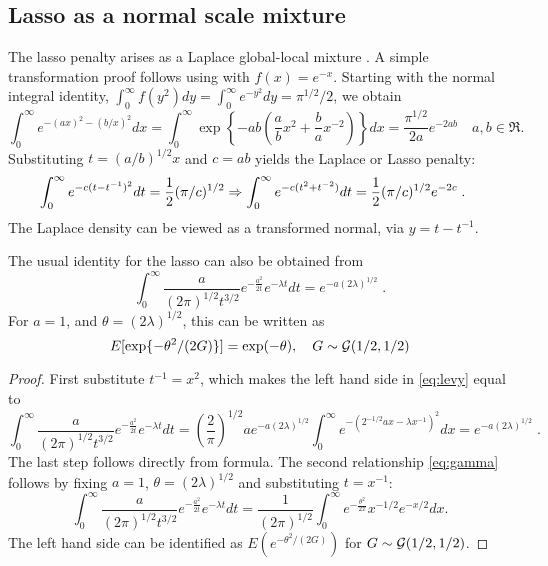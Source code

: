 \documentclass[lineno]{biometrika}
\begin{document}
\subsection{Lasso as a normal scale mixture}
The lasso penalty arises as a Laplace global-local mixture
\citep{andrews_scale_1974}.  A simple transformation proof follows using \CS{}
with $f(x) = e^{-x}$.  Starting with the normal integral identity, 
$\int_{0}^{\infty} f(y^2) dy = \int_0^\infty e^{-y^2} dy = \pi^{1/2}/2 $, we
obtain
\[
\int_0^\infty e^{-(a x)^2 - (b/x)^2} d x = \int_0^{\infty} 
\exp\left\{-a b \left(\frac{a}{b} x^2 + \frac{b}{a} x^{-2} \right)\right\} dx 
= \frac{\pi^{1/2}}{2a} e^{-2 a b}
\quad a,b \in \Re.
\]
Substituting $t = (a/b)^{1/2} x$ and $c = ab$ yields the Laplace or Lasso penalty:  
\begin{align*}
  \int_0^\infty e^{- c (t - t^{-1})^2} dt 
  &= \frac{1}{2} (\pi/c)^{1/2} 
  \Rightarrow \int_0^\infty e^{- c (t^2 + t^{-2})} dt 
  = \frac{1}{2} (\pi/c)^{1/2} e^{-2c}
  \;. 
\end{align*}
The Laplace density can be viewed as a transformed normal, via $y = t - t^{-1}$.

\begin{remark}
The usual identity for the lasso can also be obtained from \citet{levy1940certains}
\begin{equation}
  \int_{0}^{\infty} \frac{a}{(2 \pi)^{1/2} t^{3/2}} 
  e^{-\frac{a^2}{2 t}} e^{-\lambda t} dt 
  = e^{-a (2 \lambda)^{1/2} } 
  \;.
  \label{eq:levy}
\end{equation}
For $a = 1$, and $\theta = (2 \lambda)^{1/2}$, this can be written as 
\begin{equation}
  E [\exp\{-\theta^2/(2G)\}] = \exp(-\theta),\quad G \sim \GammaRV(1/2, 1/2) 
  \label{eq:gamma}
\end{equation}
\end{remark}

\begin{proof}
First substitute $t^{-1} = x^2$, which makes the left hand side in
\eqref{eq:levy} equal to 
\[
  \int_{0}^{\infty} \frac{a}{(2 \pi)^{1/2} t^{3/2}} e^{-\frac{a^2}{2 t}} e^{-\lambda t} dt = \left(\frac{2}{\pi}\right)^{1/2}ae^{-a (2 \lambda)^{1/2}} 
  \int_0^{\infty} e^{-({2}^{-1/2} ax - \lambda x^{-1})^2} dx = e^{-a (2 \lambda)^{1/2}}
  \;.
\]
The last step follows directly from \CS{} formula.  The second relationship
\eqref{eq:gamma} follows by fixing $a = 1$, $\theta = (2\lambda)^{1/2}$ and
substituting $t = x^{-1}$: 
$$
\int_{0}^{\infty} \frac{a}{(2 \pi)^{1/2} t^{3/2}} 
e^{-\frac{a^2}{2 t}} e^{-\lambda t} dt 
= \frac{1}{(2 \pi)^{1/2}} \int_{0}^{\infty} e^{-\frac{\theta^2}{2x}} 
x^{-1/2} e^{-x/2} dx.
$$
The left hand side can be identified as 
$E\left(e^{-\theta^2 / (2 G) } \right)$ for 
$G \sim \mathcal{G}(1/2, 1/2)$. 
\end{proof}
\end{document}

